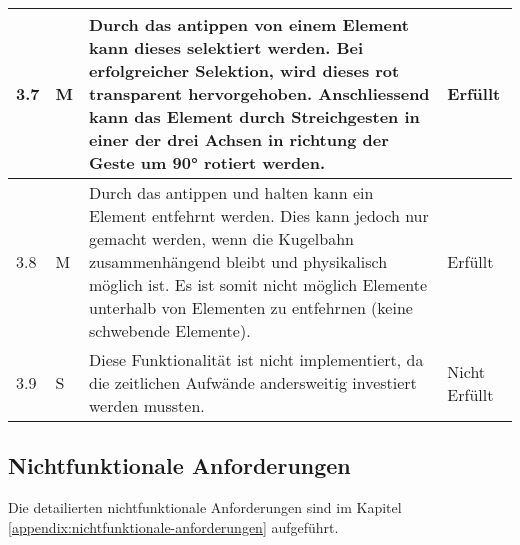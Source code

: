 \begin{longtable}{l l p{10cm} l}
	\hline
	3.7 & M & Durch das antippen von einem Element kann dieses selektiert werden. Bei erfolgreicher Selektion, wird dieses rot transparent hervorgehoben. Anschliessend kann das Element durch Streichgesten in einer der drei Achsen in richtung der Geste um 90° rotiert werden. & Erfüllt \\
	\hline
	3.8 & M & Durch das antippen und halten kann ein Element entfehrnt werden. Dies kann jedoch nur gemacht werden, wenn die Kugelbahn zusammenhängend bleibt und physikalisch möglich ist. Es ist somit nicht möglich Elemente unterhalb von Elementen zu entfehrnen (keine schwebende Elemente). & Erfüllt \\
	\hline
	3.9 & S & Diese Funktionalität ist nicht implementiert, da die zeitlichen Aufwände andersweitig investiert werden mussten. & Nicht Erfüllt \\
	\hline
\end{longtable}


\subsection{Nichtfunktionale Anforderungen}


Die detailierten nichtfunktionale Anforderungen sind im Kapitel \ref{appendix:nichtfunktionale-anforderungen} aufgeführt.

